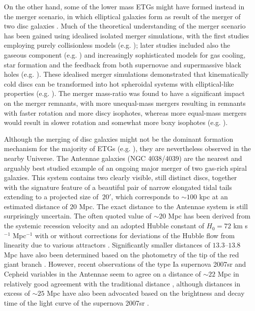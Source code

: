 \documentclass[a4paper,fleqn,usenatbib]{mnras}
\begin{document}
On the other hand, some of the lower mass ETGs might have formed instead in the merger scenario, in which elliptical galaxies form as result of the merger 
of two disc galaxies \citep{1977egsp.conf..401T,1983MNRAS.205.1009N,1992ARA&A..30..705B,2017ARA&A..55...59N}. Much of the 
theoretical understanding of the merger scenario has been gained using idealised isolated merger 
simulations, with the first studies employing purely collisionless models (e.g. \citealt{1978MNRAS.184..185W,1980ApJ...236...43A}); 
later studies included also the gaseous component (e.g. \citealt{1989ApJS...70..419H,1996ApJ...471..115B,2006MNRAS.372..839N}) 
and increasingly sophisticated models for gas cooling, star formation and the feedback from both supernovae and supermassive black holes 
 (e.g. \citealt{2005MNRAS.361..776S,2006MNRAS.373.1013C,2009ApJ...690..802J,2009ApJ...707L.184J,2010ApJ...720L.149T,2013MNRAS.430.1901H,2014MNRAS.442.1992H}). 
These idealised merger simulations demonstrated that kinematically cold discs can be transformed into hot spheroidal systems with elliptical-like
properties (e.g. \citealt{1983MNRAS.205.1009N,1992ARA&A..30..705B}). The merger mass-ratio was 
found to have a significant impact on the merger remnants, with more unequal-mass mergers
resulting in remnants with faster rotation and more discy isophotes, whereas more equal-mass mergers would result in slower rotation and somewhat more boxy
isophotes (e.g. \citealt{2003ApJ...597..893N,2005A&A...437...69B,2006ApJ...650..791C,2009MNRAS.397.1202J,2010ApJ...723..818H,2011MNRAS.416.1654B,2017ARA&A..55...59N}).

Although the merging of disc galaxies might not be the dominant formation mechanism for the majority 
of ETGs (e.g. \citealt{2009ApJ...690.1452N}), they are nevertheless observed in the nearby Universe. 
The Antennae galaxies (NGC 4038/4039) are the nearest and arguably best studied example of an ongoing 
major merger of two gas-rich spiral galaxies. This system contains two clearly visible, still distinct 
discs, together with the signature feature of a beautiful pair of narrow elongated tidal tails extending to a projected 
size of $~20'$, which corresponds to $\sim 100$ kpc at an estimated distance of $20$ Mpc. The exact distance to 
the Antennae system is still surprisingly uncertain. The often quoted value of $\sim 20$ Mpc has been derived from the systemic recession 
velocity and an adopted Hubble constant of $H_{0}=72$ km s$^{-1}$ Mpc$^{-1}$ with or without corrections
for deviations of the Hubble flow from linearity due to various attractors \citep{1999AJ....118.1551W,2008AJ....136.1482S}. Significantly 
smaller distances of $13.3$--$13.8$ Mpc have also been determined based on the photometry of the tip of the red giant branch 
\citep{2004AJ....127..660S, 2008ApJ...678..179S}. However, recent observations of the type Ia supernova 2007sr and Cepheid variables in the Antennae seem to agree
on a distance of $\sim 22$ Mpc in relatively good agreement with the traditional distance 
\citep{2008ApJ...678..179S,2011ApJ...730..119R, 2013AJ....146...86T, 2013MNRAS.434.2866F}, although distances in excess of $\sim 25$ Mpc have also been advocated
based on the brightness and decay time of the light curve of the supernova 2007sr \citep{2008MNRAS.388..487N}.
\end{document}
